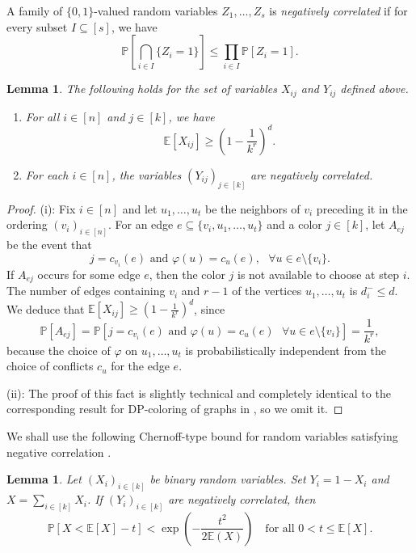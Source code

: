 \documentclass[12pt]{article}
\newtheorem{lemma}[theorem]{Lemma}
\newcommand{\E}{\mathbb{E}}
\renewcommand{\P}{\mathbb{P}}
\newcommand{\1}{\mathds{1}}
\begin{document}
A family of $\{0,1\}$-valued random variables $Z_1,\dots, Z_s$ is {\em negatively correlated} if for every subset
$I \subseteq [s]$, we have
$$\P\left[\bigcap_{i\in I} \{Z_i=1\}\right] \leq \prod_{i \in I} \P[Z_i =1].$$
%
\begin{lemma}
    \label{Lemma: (Hypergraphs) (i) E and (ii) negatively correlation}
    The following holds for the set of variables $X_{ij}$ and $Y_{ij}$ defined above.
    \begin{enumerate}
        \item[(i)] For all $i\in [n]$ and $j\in [k]$, we have 
        $$
        \E[X_{ij}]\geq \left(1-\frac{1}{k^r}\right)^d.$$
        \item[(ii)] For each $i\in [n]$, the variables $(Y_{ij})_{j\in [k]}$ are negatively correlated.
    \end{enumerate}
\end{lemma}
\begin{proof}
    (i): Fix $i\in [n]$ and let $u_1,\dots, u_t$ be the neighbors of $v_i$ preceding it in the ordering $(v_i)_{i\in [n]}$. For an edge $e\subseteq \{v_i,u_1,\dots, u_t\}$ and a color $j\in[k]$, let $A_{ej}$ be the event that 
    $$
    j=c_{v_i}(e) \text{ and } \varphi(u)=c_{u}(e), \text{ }\forall u \in e\setminus\{v_i\}.
    $$ 
    If $A_{ej}$ occurs for some edge $e$, then the color $j$ is not available to choose at step $i$. The number of edges containing $v_i$ and $r-1$ of the vertices $u_1,\dots, u_t$ is $d_i^-\leq d$. We deduce that
   $\E[X_{ij}]  
               \geq \left(1-\frac{1}{k^r}\right)^{d}$,
    since
    $$
    \P[A_{ej}]=\P[j=c_{v_i}(e) \text{ and } \varphi(u)=c_u(e) \text{ }\forall u\in e\setminus\{v_i\}] =\frac{1}{k^r},
    $$
	because the choice of $\varphi$ on $u_1,\dots, u_t$ is probabilistically independent from
	the choice of conflicts $c_{u}$ for the edge $e$.

    (ii): The proof of this fact is slightly technical and completely identical to the corresponding
	result for DP-coloring of graphs in \cite{BernshteynDominikKaulMudrock}, so we omit it.
\end{proof}

\vspace{\baselineskip}


We shall use the following
Chernoff-type bound for random variables satisfying negative correlation 
\cite{Molloy, PancosiSrinivasan}.

\begin{lemma}
\label{Lemma: C-H bound negative correlation}
    Let $(X_{i})_{i\in [k]}$ be binary random variables. Set $Y_{i}=1-X_i$ and $X=\sum_{i\in [k]}X_i$. If $(Y_i)_{i\in [k]}$ are negatively correlated, then
    $$
    \P[X<\E[X]-t]<\exp\left(-\frac{t^2}{2\E(X)}\right) \quad \text{for all } 0<t\leq \E[X].
    $$
\end{lemma}
\end{document}
